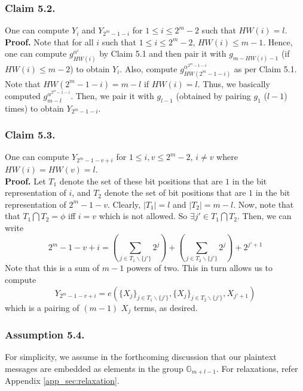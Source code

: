 \subsubsection{Claim 5.2.} One can compute $Y_{i}$ and $Y_{2^m-1-i}$ for $1\leq i\leq 2^m-2$ such that $HW(i)=l$.\\

\noindent\textbf{Proof.} Note that for all $i$ such that $1\leq i\leq 2^m-2$, $HW(i)\leq m-1$. Hence, one can compute $g^{\alpha^i}_{HW(i)}$ by Claim 5.1 and then pair it with $g_{m-HW(i)-1}$ (if $HW(i)\leq m-2$) to obtain $Y_{i}$.  Also, compute $g^{\alpha^{2^m-1-i}}_{HW(2^m-1-i)}$ as per Claim 5.1. Note that $HW(2^m-1-i)=m-l$ if $HW(i)=l$. Thus, we basically computed $g^{\alpha^{2^m-1-i}}_{m-l}$. Then, we pair it with $g_{l-1}$ (obtained by pairing $g_1$ ($l-1$) times) to obtain $Y_{2^m-1-i}$. 

\subsubsection{Claim 5.3.}  One can compute $Y_{2^m-1-v+i}$ for $1\leq i,v\leq 2^m-2$, $i\neq v$ where $HW(i)=HW(v)=l$.\\

\noindent\textbf{Proof.} Let $T_1$ denote the set of these bit positions that are $1$ in the bit representation of $i$, and $T_2$ denote the set of bit positions that are $1$ in the bit representation of $2^m-1-v$. Clearly, $|T_1|=l$ and $|T_2|=m-l$. Now, note that that $T_1\bigcap T_2=\phi$ iff $i=v$ which is not allowed. So $\exists j'\in T_1\bigcap T_2$. Then, we can write
\begin{equation}
{2^m-1-v+i}=\left(\sum_{j\in T_1\backslash\{j'\}}2^j\right) + \left(\sum_{j\in T_2\backslash\{j'\}}2^j\right) + 2^{j'+1}\nonumber
\end{equation}
\noindent Note that this is a sum of $m-1$ powers of two. This in turn allows us to compute
\begin{equation}
 Y_{2^m-1-v+i}=e\left(\{X_j\}_{j\in T_1\backslash\{j'\}},\{X_j\}_{j\in T_2\backslash\{j'\}},X_{j'+1}\right)\nonumber
\end{equation}
which is a pairing of $(m-1)$ $X_j$ terms, as desired.

\subsubsection{Assumption 5.4.} For simplicity, we assume in the forthcoming discussion that our plaintext messages are embedded as elements in the group $\mathbb{G}_{m+l-1}$. For relaxations, refer Appendix \ref{app_sec:relaxation}.

